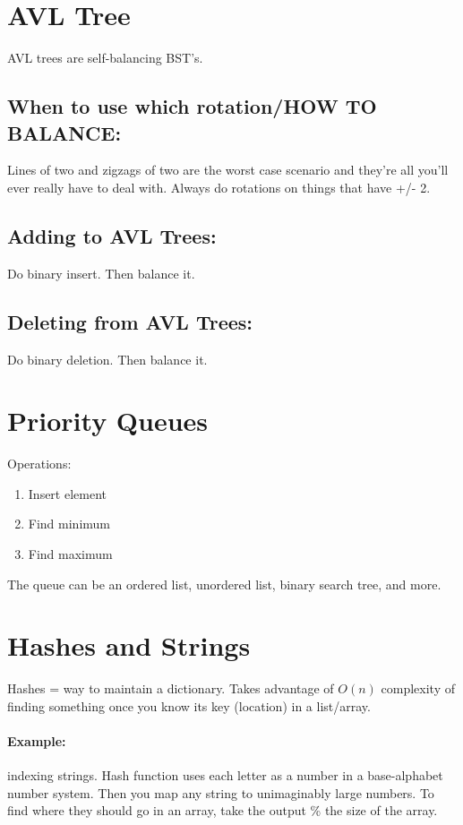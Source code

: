 \documentclass[a4paper,12pt]{report}
\begin{document}
\section{AVL Tree}
AVL trees are self-balancing BST's.
\subsection{When to use which rotation/HOW TO BALANCE: }
Lines of two and zigzags of two are the worst case scenario and they're all you'll ever really have to deal with.
Always do rotations on things that have +/- 2. 

\subsection{Adding to AVL Trees: }
Do binary insert. Then balance it. 

\subsection{Deleting from AVL Trees: }
Do binary deletion. Then balance it.

\section{Priority Queues}
Operations:
\begin{enumerate}
\item Insert element
\item Find minimum
\item Find maximum
\end{enumerate}

The queue can be an ordered list, unordered list, binary search tree, and more. 

\section{Hashes and Strings}
Hashes = way to maintain a dictionary. Takes advantage of $O(n)$ complexity of finding something once you know its key (location) in a list/array. 

\paragraph{Example: } indexing strings. Hash function uses each letter as a number in a base-alphabet number system. Then you map any string to unimaginably large numbers. To find where they should go in an array, take the output \% the size of the array.
\end{document}
